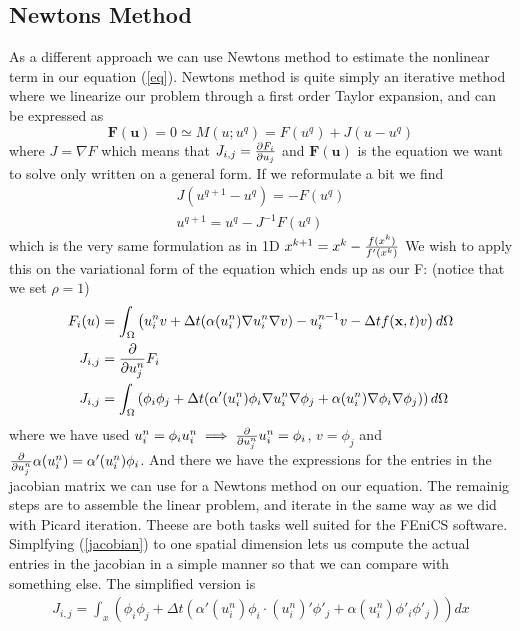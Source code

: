 \documentclass[a4paper,english, 10pt, twoside]{article}
\renewcommand{\d}{\partial}
\begin{document}
\subsection*{Newtons Method}
As a different approach we can use Newtons method to estimate the nonlinear term in our equation (\ref{eq}). Newtons method is quite simply 
an iterative method where we linearize our problem through a first order Taylor expansion, and can be expressed as
$$
\mathbf{F}(\mathbf{u}) = 0 \simeq M(u;u^q) = F(u^q) +J(u-u^q)
$$
where $J=\nabla F$ which means that $J_{i,j} = {\d F_i \over \d u_j}$ and $\mathbf{F}(\mathbf{u})$ is the equation we want to solve 
only written on a general form. If we reformulate a bit we find
\begin{align*}
 J(u^{q+1}-u^q) = -F(u^q) \\
 u^{q+1} = u^q-J^{-1}F(u^q)
\end{align*}
which is the very same formulation as in 1D $x^{k+1} = x^k - {f(x^k) \over f'(x^k)}$
We wish to apply this on the variational form of the equation which ends up as our F: (notice that we set $\rho=1$)
\begin{align}
\nonumber
F_i(u) &= \int_\Omega\left(u_i^nv +\Delta t(\alpha(u_i^n)\nabla u_i^n \nabla v) -u_i^{n-1}v -\Delta tf(\mathbf{x},t)v 
 \right)d\Omega \\ \nonumber
 J_{i,j} &= {\d \over \d u_j^n}F_i \\
 J_{i,j} &= \int_\Omega\left(\phi_i\phi_j +\Delta t(\alpha'(u_i^n)\phi_i\nabla u_i^n \nabla \phi_j + 
 \alpha(u_i^n)\nabla \phi_i\nabla\phi_j) \right)d\Omega \label{jacobian}
\end{align}
where we have used $u_i^n = \phi_i u_i^n \implies {\d \over \d u_j^n}u_i^n = \phi_i$, $v=\phi_j$ and ${\d \over \d u_j^n}\alpha(u_i^n) = 
\alpha'(u_i^n)\phi_i$. And there we have the expressions for the entries in the jacobian matrix we can use for a Newtons method 
on our equation. The remainig steps are to assemble the linear problem, and iterate in the same way as we did with Picard iteration. 
Theese are both tasks well suited for the FEniCS software.\\ 
Simplfying (\ref{jacobian}) to one spatial dimension lets us compute the actual entries in the jacobian in a simple manner 
so that we can compare with something else. The simplified version is
\begin{align*}
  J_{i,j} = \int_x\left(\phi_i\phi_j +\Delta t(\alpha'(u_i^n)\phi_i\cdot(u_i^n)'\phi'_j + 
 \alpha(u_i^n)\phi'_i\phi'_j) \right)dx \\
\end{align*}
\end{document}
